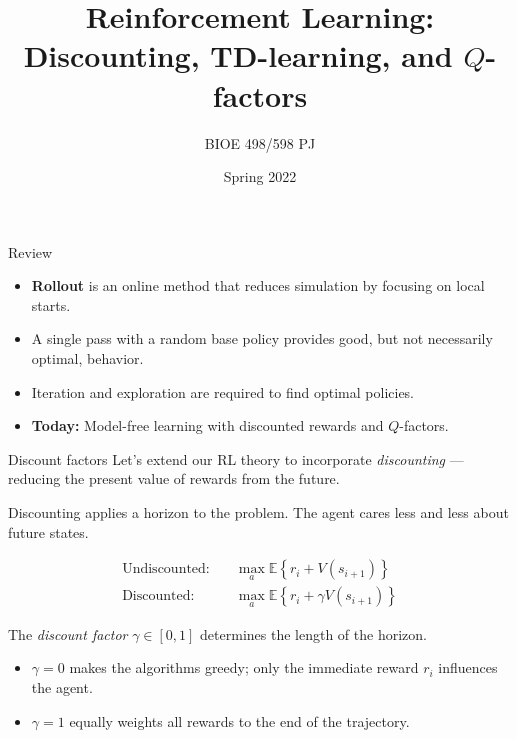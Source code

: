 \documentclass[9pt]{beamer}
\title{Reinforcement Learning:\\Discounting, TD-learning, and $Q$-factors}
\author{BIOE 498/598 PJ}
\date{Spring 2022}
\newcommand\lspace{\addtolength{\itemsep}{0.5\baselineskip}}
\begin{document}
\frame{\titlepage}


\begin{frame}{Review}

\begin{itemize}\lspace
	\item \textbf{Rollout} is an online method that reduces simulation by focusing on local starts.
	\item A single pass with a random base policy provides good, but not necessarily optimal, behavior.
	\item Iteration and exploration are required to find optimal policies.
	\item<2-> \textbf{Today:} Model-free learning with discounted rewards and $Q$-factors.
\end{itemize}

\end{frame}

\begin{frame}{Discount factors}
	Let's extend our RL theory to incorporate \emph{discounting} --- reducing the present value of rewards from the future.
	
	\bigskip
	Discounting applies a horizon to the problem. The agent cares less and less about future states.
	
	\pause
	\begin{align*}
		\text{Undiscounted:}&\quad \max_{a} \mathbb{E}\left\{ r_i + V(s_{i+1}) \right\} \\
		\text{Discounted:}&\quad \max_{a} \mathbb{E}\left\{ r_i + \gamma V(s_{i+1}) \right\}
	\end{align*}
	
	\pause
	The \emph{discount factor} $\gamma \in [0,1]$ determines the length of the horizon.
	\medskip
	\begin{itemize}\lspace
		\item $\gamma=0$ makes the algorithms greedy; only the immediate reward $r_i$ influences the agent.
		\item $\gamma=1$ equally weights all rewards to the end of the trajectory.
	\end{itemize}

\end{frame}
\end{document}
